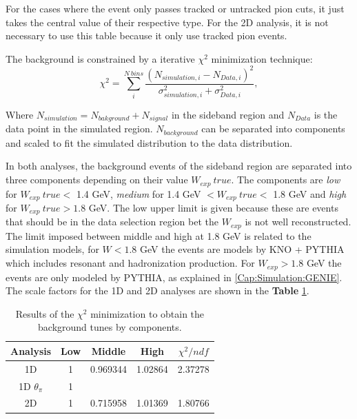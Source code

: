 For the cases where the event only passes tracked or untracked pion cuts, it just takes the central value of their respective type. For the 2D analysis, it is not necessary to use this table because it only use tracked pion events. 

The background is constrained by a iterative $\chi^2$ minimization technique:
\begin{equation}
    \chi^2=\sum^{N\ bins}_i \frac{\left(N_{simulation,i}-N_{Data,i}\right)^2}{\sigma^2_{simulation,i}+\sigma^2_{Data,i}},
\end{equation}

Where $N_{simulation}=N_{bakground}+N_{signal}$ in the sideband region and $N_{Data}$ is the data point in the simulated region. $N_{background}$  can be separated into components and scaled to fit the simulated distribution to the data distribution.  

In both analyses, the background events of the sideband region are separated into three components depending on their value $W_{exp}\ true$. The components are \textit{low} for $W_{exp}\ true<$ 1.4 GeV, \textit{ medium} for 1.4 GeV $<W_{exp}\ true< $ 1.8 GeV and \textit{high} for $W_{exp}\ true > 1.8$ GeV. The low upper limit is given because these are events that should be in the data selection region bet the $W_{exp}$ is not well reconstructed. The limit imposed between middle and high at 1.8 GeV is related to the simulation models, for $W < 1.8$ GeV the events are models by KNO + PYTHIA which includes resonant and hadronization production. For $W_{exp} > 1.8$ GeV the events are only modeled by PYTHIA, as explained in \ref{Cap:Simulation:GENIE}. The scale factors for the 1D and 2D analyses are shown in the \textbf{Table} \ref{tab:BgStudies:SidebandTunning:BGtunes}.

\begin{table}[!htb]
    \centering
    \begin{tabular}{c|c|c|c|c}
         Analysis & Low & Middle   &   High  & $\chi^2/ndf$ \\ \hline
         1D       & 1   & 0.969344 & 1.02864 & 2.37278 \\
         1D $\theta_\pi$& 1 & & & \\
         2D  & 1 &  0.715958 & 1.01369  & 1.80766
    \end{tabular}
    \caption{Results of the $\chi^2$ minimization to obtain the background tunes by components.}
    \label{tab:BgStudies:SidebandTunning:BGtunes}
\end{table}


